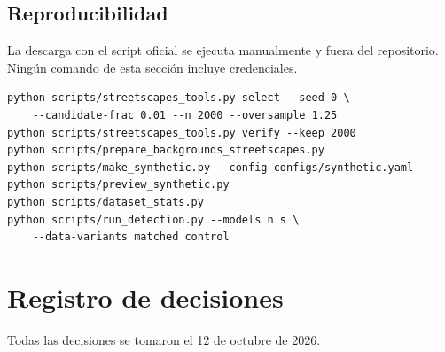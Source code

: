 \documentclass[11pt,a4paper]{article}
\begin{document}
\subsection{Reproducibilidad}

La descarga con el script oficial se ejecuta manualmente y fuera del repositorio. Ning\'un
comando de esta secci\'on incluye credenciales.

\begin{verbatim}
python scripts/streetscapes_tools.py select --seed 0 \
    --candidate-frac 0.01 --n 2000 --oversample 1.25
python scripts/streetscapes_tools.py verify --keep 2000
python scripts/prepare_backgrounds_streetscapes.py
python scripts/make_synthetic.py --config configs/synthetic.yaml
python scripts/preview_synthetic.py
python scripts/dataset_stats.py
python scripts/run_detection.py --models n s \
    --data-variants matched control
\end{verbatim}

\section{Registro de decisiones}

Todas las decisiones se tomaron el 12 de octubre de 2026.
\end{document}
